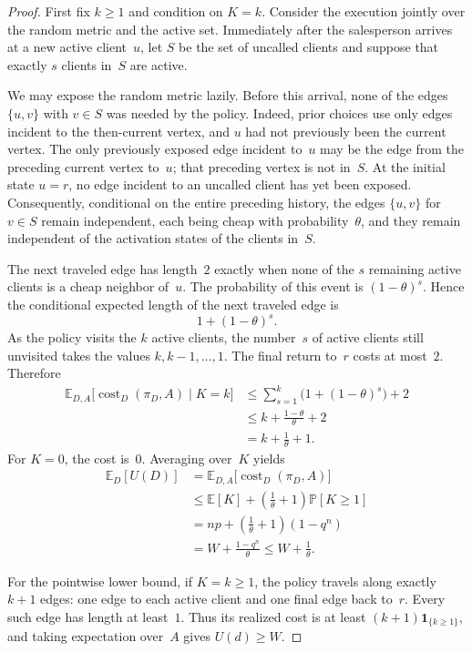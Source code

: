 \documentclass[11pt]{article}
\theoremstyle{remark}
\newcommand{\E}{\mathbb{E}}
\newcommand{\Prob}{\mathbb{P}}
\newcommand{\one}{\mathbf{1}}
\newcommand{\cost}{\operatorname{cost}}
\begin{document}
\begin{proof}
First fix $k\geq1$ and condition on $K=k$.  Consider the execution jointly over
the random metric and the active set.  Immediately after the salesperson
arrives at a new active client~$u$, let $S$ be the set of uncalled clients and
suppose that exactly $s$ clients in~$S$ are active.

We may expose the random metric lazily.  Before this arrival, none of the edges
$\{u,v\}$ with $v\in S$ was needed by the policy.  Indeed, prior choices use
only edges incident to the then-current vertex, and $u$ had not previously been
the current vertex.  The only previously exposed edge incident to~$u$ may be
the edge from the preceding current vertex to~$u$; that preceding vertex is not
in~$S$.  At the initial state $u=r$, no edge incident to an uncalled client has
yet been exposed.  Consequently, conditional on the entire preceding history,
the edges $\{u,v\}$ for $v\in S$ remain independent, each being cheap with
probability~$\theta$, and they remain independent of the activation states of
the clients in~$S$.

The next traveled edge has length~$2$ exactly when none of the $s$ remaining
active clients is a cheap neighbor of~$u$.  The probability of this event is
$(1-\theta)^s$.  Hence the conditional expected length of the next traveled
edge is
\[
    1+(1-\theta)^s.
\]
As the policy visits the $k$ active clients, the number~$s$ of active clients
still unvisited takes the values $k,k-1,\ldots,1$.  The final return to~$r$ costs
at most~$2$.  Therefore
\begin{align*}
    \E_{D,A}\bigl[\cost_D(\pi_D,A)\mid K=k\bigr]
    &\leq
    \sum_{s=1}^k\bigl(1+(1-\theta)^s\bigr)+2\\
    &\leq
    k+\frac{1-\theta}{\theta}+2\\
    &=k+\frac{1}{\theta}+1.
\end{align*}
For $K=0$, the cost is~$0$.  Averaging over~$K$ yields
\begin{align*}
    \E_D[U(D)]
    &=\E_{D,A}\bigl[\cost_D(\pi_D,A)\bigr]\\
    &\leq
    \E[K]
    +\left(\frac{1}{\theta}+1\right)\Prob[K\geq1]\\
    &=np+\left(\frac{1}{\theta}+1\right)(1-q^n)\\
    &=W+\frac{1-q^n}{\theta}
    \leq W+\frac{1}{\theta}.
\end{align*}

For the pointwise lower bound, if $K=k\geq1$, the policy travels along exactly
$k+1$ edges: one edge to each active client and one final edge back to~$r$.
Every such edge has length at least~$1$.  Thus its realized cost is at least
$(k+1)\one_{\{k\geq1\}}$, and taking expectation over~$A$ gives $U(d)\geq W$.
\end{proof}
\end{document}
